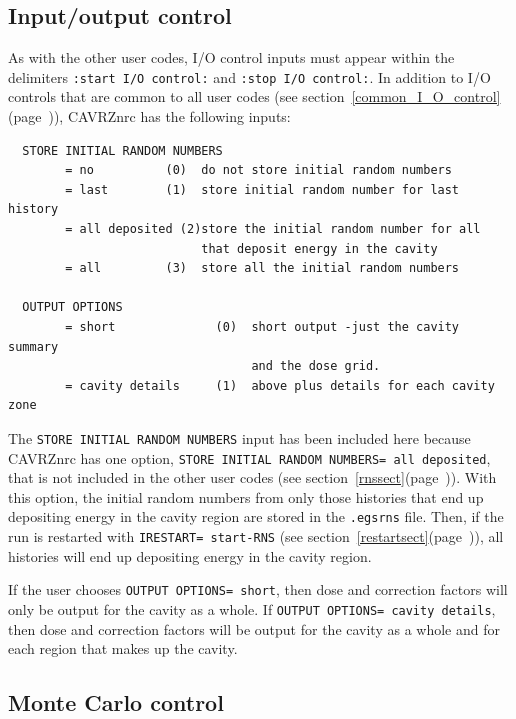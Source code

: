 \documentclass[12pt,twoside]{article}  %
\newcommand{\lpage}[1]{(page~\pageref{#1})}
\begin{document}
\subsection{Input/output control}
\label{cavrziosect}

As with the other user codes, I/O control inputs must appear within
the delimiters {\tt :start I/O control:} and {\tt :stop I/O control:}.
In addition to I/O controls that are common to all user codes (see
section~\ref{common_I_O_control}\lpage{common_I_O_control}), CAVRZnrc
has the following inputs:
\begin{verbatim}
  STORE INITIAL RANDOM NUMBERS
        = no          (0)  do not store initial random numbers
        = last        (1)  store initial random number for last history
        = all deposited (2)store the initial random number for all
                           that deposit energy in the cavity
        = all         (3)  store all the initial random numbers

  OUTPUT OPTIONS
        = short              (0)  short output -just the cavity summary
                                  and the dose grid.
        = cavity details     (1)  above plus details for each cavity zone
\end{verbatim}
The {\tt STORE INITIAL RANDOM NUMBERS} input has been included here because
CAVRZnrc has one option, {\tt STORE INITIAL RANDOM NUMBERS= all deposited},
that is not included in the other user codes (see
section~\ref{rnssect}\lpage{rnssect}).
With this option, the initial random numbers from only those histories that
end up depositing energy in the cavity region are stored in the
{\tt .egsrns} file.  Then, if the run is restarted with
{\tt IRESTART= start-RNS} (see section~\ref{restartsect}\lpage{restartsect}),
all histories will end up depositing energy in the cavity region.

If the user chooses {\tt OUTPUT OPTIONS= short}, then dose and correction
factors will only be output for the cavity as a whole.  If
{\tt OUTPUT OPTIONS= cavity details}, then dose and correction factors
will be output for the cavity as a whole and for each region that makes up
the cavity.

\subsection{Monte Carlo control}
\end{document}
